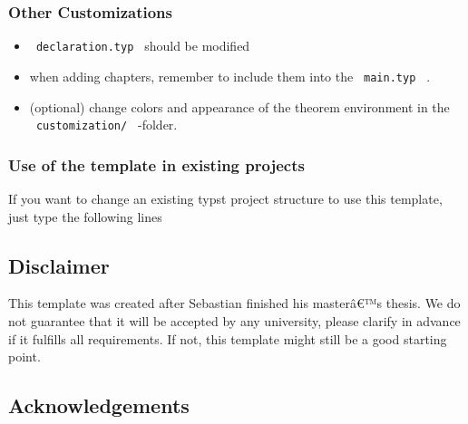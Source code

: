 \subsubsection{Other Customizations}\label{other-customizations}

\begin{itemize}
\tightlist
\item
  \texttt{\ declaration.typ\ } should be modified
\item
  when adding chapters, remember to include them into the
  \texttt{\ main.typ\ } .
\item
  (optional) change colors and appearance of the theorem environment in
  the \texttt{\ customization/\ } -folder.
\end{itemize}

\subsubsection{Use of the template in existing
projects}\label{use-of-the-template-in-existing-projects}

If you want to change an existing typst project structure to use this
template, just type the following lines

\begin{Shaded}
\begin{Highlighting}[]

\NormalTok{)}

\end{Highlighting}
\end{Shaded}

\subsection{Disclaimer}\label{disclaimer}

This template was created after Sebastian finished his masterâ€™s
thesis. We do not guarantee that it will be accepted by any university,
please clarify in advance if it fulfills all requirements. If not, this
template might still be a good starting point.

\subsection{Acknowledgements}\label{acknowledgements}

